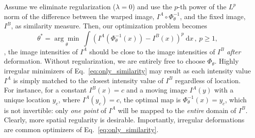Assume we eliminate regularization ($\lambda=0$) and use the $p$-th power of the $L^p$ norm of the difference between the warped image, $I^A\circ\Phi_\theta^{-1}$, and the fixed image, $I^B$, as similarity measure. Then, our optimization problem becomes
\begin{equation}
  \theta^* = \underset{\theta}{\arg \min}~\int (I^A(\Phi_\theta^{-1}(x))-I^B(x))^p~\mathrm{d}x\,,~p\geq 1, \label{eq:only_similarity}
\end{equation}
\ie, the image intensities of $I^A$ should be close to the image intensities of $I^B$ \emph{after} deformation. Without regularization, we are entirely free to choose $\Phi_\theta$. Highly irregular minimizers of Eq.~\eqref{eq:only_similarity} may result as each intensity value $I^A$ is simply matched to the closest intensity value of $I^B$ regardless of location. For instance, for a constant $I^B(x)=c$ and a moving image $I^A(y)$ with a unique location $y_c$, where $I^A(y_c)=c$, the optimal map is $\Phi_\theta^{-1}(x) = y_c$, which  is not invertible: only \emph{one point} of $I^A$ will be mapped to the \emph{entire} domain of $I^B$. Clearly, more spatial regularity is desirable. Importantly, irregular deformations are common optimizers of Eq.~\eqref{eq:only_similarity}. 


